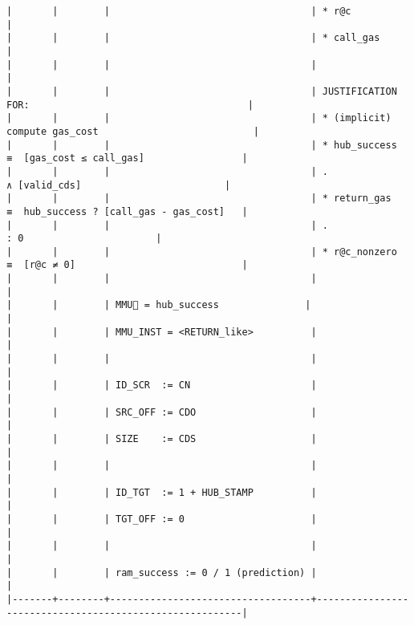 \documentclass[varwidth=\maxdimen,margin=0.5cm,multi={verbatim}]{standalone}
\begin{document}
\begin{verbatim}
|       |        |                                   | * r@c                                                   |
|       |        |                                   | * call_gas                                              |
|       |        |                                   |                                                         |
|       |        |                                   | JUSTIFICATION FOR:                                      |
|       |        |                                   | * (implicit) compute gas_cost                           |
|       |        |                                   | * hub_success  ≡  [gas_cost ≤ call_gas]                 |
|       |        |                                   | .                 ∧ [valid_cds]                         |
|       |        |                                   | * return_gas   ≡  hub_success ? [call_gas - gas_cost]   |
|       |        |                                   | .                             : 0                       |
|       |        |                                   | * r@c_nonzero  ≡  [r@c ≠ 0]                             |
|       |        |                                   |                                                         |
|       |        | MMU🚩 = hub_success               |                                                         |
|       |        | MMU_INST = <RETURN_like>          |                                                         |
|       |        |                                   |                                                         |
|       |        | ID_SCR  := CN                     |                                                         |
|       |        | SRC_OFF := CDO                    |                                                         |
|       |        | SIZE    := CDS                    |                                                         |
|       |        |                                   |                                                         |
|       |        | ID_TGT  := 1 + HUB_STAMP          |                                                         |
|       |        | TGT_OFF := 0                      |                                                         |
|       |        |                                   |                                                         |
|       |        | ram_success := 0 / 1 (prediction) |                                                         |
|-------+--------+-----------------------------------+---------------------------------------------------------|



\end{verbatim}
\end{document}
